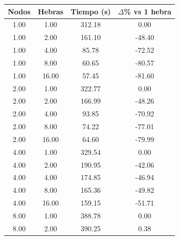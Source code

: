 \begin{table}[ht]
    \centering
    \begin{tabular}{|c|c|c|c|}
        \hline
        \textbf{Nodos} & \textbf{Hebras} & \textbf{Tiempo (s)} & \textbf{$\Delta$\% vs 1 hebra} \\
        \hline
        1.00           & 1.00            & 312.18              & 0.00                           \\
        1.00           & 2.00            & 161.10              & -48.40                         \\
        1.00           & 4.00            & 85.78               & -72.52                         \\
        1.00           & 8.00            & 60.65               & -80.57                         \\
        1.00           & 16.00           & 57.45               & -81.60                         \\
        2.00           & 1.00            & 322.77              & 0.00                           \\
        2.00           & 2.00            & 166.99              & -48.26                         \\
        2.00           & 4.00            & 93.85               & -70.92                         \\
        2.00           & 8.00            & 74.22               & -77.01                         \\
        2.00           & 16.00           & 64.60               & -79.99                         \\
        4.00           & 1.00            & 329.54              & 0.00                           \\
        4.00           & 2.00            & 190.95              & -42.06                         \\
        4.00           & 4.00            & 174.85              & -46.94                         \\
        4.00           & 8.00            & 165.36              & -49.82                         \\
        4.00           & 16.00           & 159.15              & -51.71                         \\
        8.00           & 1.00            & 388.78              & 0.00                           \\
        8.00           & 2.00            & 390.25              & 0.38                           \\

\end{tabular}
\end{table}
